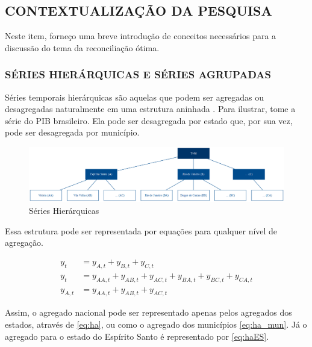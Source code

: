 \documentclass[
  12pt,
  oneside,
  a4paper,
  chapter=TITLE,
  section=TITLE,
  subsubsection=TITLE,
  brazil]{abntex2}
\begin{document}
\hypertarget{contextualizauxe7uxe3o-da-pesquisa}{%
\subsection{CONTEXTUALIZAÇÃO DA
PESQUISA}\label{contextualizauxe7uxe3o-da-pesquisa}}

Neste item, forneço uma breve introdução de conceitos necessários para a
discussão do tema da reconciliação ótima.

\hypertarget{suxe9ries-hieruxe1rquicas-e-suxe9ries-agrupadas}{%
\subsubsection{SÉRIES HIERÁRQUICAS E SÉRIES
AGRUPADAS}\label{suxe9ries-hieruxe1rquicas-e-suxe9ries-agrupadas}}

Séries temporais hierárquicas são aquelas que podem ser agregadas ou
desagregadas naturalmente em uma estrutura aninhada
\autocite{hyndman2021}. Para ilustrar, tome a série do PIB brasileiro.
Ela pode ser desagregada por estado que, por sua vez, pode ser
desagregada por município.

\begin{figure}

{\centering \includegraphics{img/hierarq.png}

}

\caption{\label{fig-h}Séries Hierárquicas}

\end{figure}

Essa estrutura pode ser representada por equações para qualquer nível de
agregação.

\begin{align}
y_t &= y_{A,t} + y_{B,t} + y_{C,t} \label{eq:ha} \\
y_t &= y_{AA,t} + y_{AB,t} + y_{AC,t} + y_{BA,t} + y_{BC,t} + y_{CA,t}\label{eq:ha_mun} \\
y_{A,t} &= y_{AA,t} + y_{AB,t} + y_{AC,t} \label{eq:haES}
\end{align}

Assim, o agregado nacional pode ser representado apenas pelos agregados
dos estados, através de \eqref{eq:ha}, ou como o agregado dos municípios
\eqref{eq:ha_mun}. Já o agregado para o estado do Espírito Santo é
representado por \eqref{eq:haES}.
\end{document}
